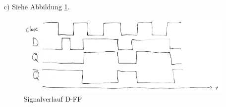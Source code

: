 \documentclass{article}
\begin{document}
\begin{enumerate}
		Der D-FF ist eine Erweiterung des D-Latch: Er erlaubt einen Wechsel des gespeicherten Zustands nur, wenn auch das Control-Signal "`C"' aktiv ist. Ansonsten verharrt der D-FF im Hold-Zustand. Der Vorteil dabei ist, dass der D-Eingang nicht ständig auf der gewünschten 1 oder 0 gehalten werden muss, sondern beliebige Werte annehmen kann, solange nicht auch der Control-Eingang aktiviert wird. Im D-FF kann somit dauerhaft ein Zustand gespeichert werden und ggf. durch Aktivierung des Control-Eingangs verändert werden. 
		\item[c)] Siehe Abbildung \ref{f:signalverlauf_dff}.
		\begin{figure}[h]
			\centering
			\includegraphics[width=\linewidth]{signalverlauf_dff.jpeg}
			\caption{Signalverlauf D-FF}
			\label{f:signalverlauf_dff}
		\end{figure}
		 
	\end{enumerate}
\end{document}
